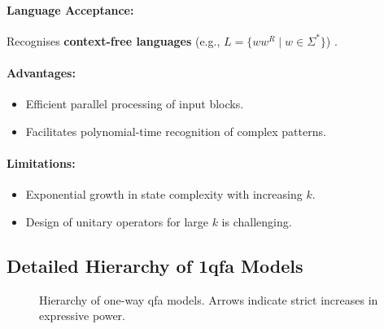 \paragraph{Language Acceptance:}  
Recognises \textbf{context-free languages} (e.g., \( L = \{ww^R \mid w \in \Sigma^*\} \)) \cite{ravikumar2003}.

\paragraph{Advantages:}
\begin{itemize}
    \item Efficient parallel processing of input blocks.
    \item Facilitates polynomial-time recognition of complex patterns.
\end{itemize}

\paragraph{Limitations:}
\begin{itemize}
    \item Exponential growth in state complexity with increasing \( k \).
    \item Design of unitary operators for large \( k \) is challenging.
\end{itemize}

\subsection*{Detailed Hierarchy of \gls{1qfa} Models}
\label{subsec:hierarchy-diagram}

\begin{figure}[ht]
    \centering
    \caption{Hierarchy of one-way \gls{qfa} models. Arrows indicate strict increases in expressive power.}
    \label{fig:qfa-hierarchy}
\end{figure}


